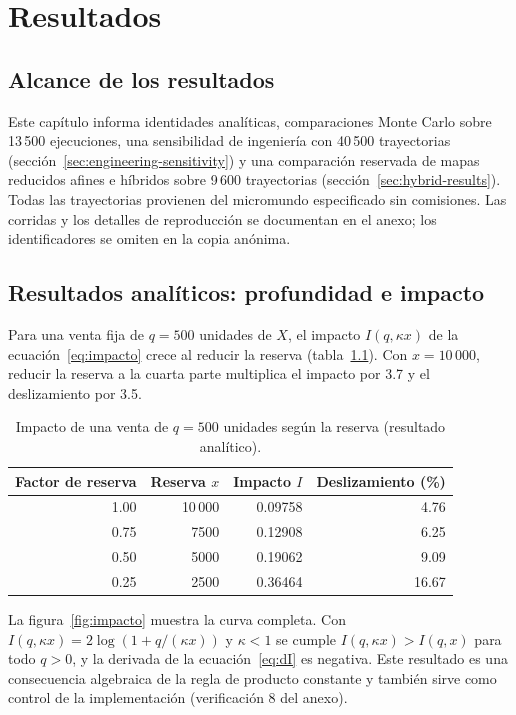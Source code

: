 \chapter{Resultados}
\label{cap:resultados}

\section{Alcance de los resultados}

Este capítulo informa identidades analíticas, comparaciones Monte Carlo sobre 13\,500 ejecuciones, una sensibilidad de ingeniería con 40\,500 trayectorias (sección~\ref{sec:engineering-sensitivity}) y una comparación reservada de mapas reducidos afines e híbridos sobre 9\,600 trayectorias (sección~\ref{sec:hybrid-results}). Todas las trayectorias provienen del micromundo especificado sin comisiones. Las corridas y los detalles de reproducción se documentan en el anexo; los identificadores se omiten en la copia anónima.

\section{Resultados analíticos: profundidad e impacto}
\label{sec:res-analitico}

Para una venta fija de $q=500$ unidades de $X$, el impacto $I(q,\kappa x)$ de la ecuación~\eqref{eq:impacto} crece al reducir la reserva (tabla~\ref{tab:impacto}). Con $x=10\,000$, reducir la reserva a la cuarta parte multiplica el impacto por 3.7 y el deslizamiento por 3.5.

\begin{table}[htbp]
\centering
\caption{Impacto de una venta de $q=500$ unidades según la reserva (resultado analítico).}
\label{tab:impacto}
\small
\begin{tabular}{@{}rrrr@{}}
\toprule
Factor de reserva & Reserva $x$ & Impacto $I$ & Deslizamiento (\%) \\
\midrule
1.00 & 10\,000 & 0.09758 & 4.76 \\
0.75 & 7500 & 0.12908 & 6.25 \\
0.50 & 5000 & 0.19062 & 9.09 \\
0.25 & 2500 & 0.36464 & 16.67 \\
\bottomrule
\end{tabular}
\end{table}

La figura~\ref{fig:impacto} muestra la curva completa. Con $I(q,\kappa x)=2\log(1+q/(\kappa x))$ y $\kappa<1$ se cumple $I(q,\kappa x)>I(q,x)$ para todo $q>0$, y la derivada de la ecuación~\eqref{eq:dI} es negativa. Este resultado es una consecuencia algebraica de la regla de producto constante y también sirve como control de la implementación (verificación 8 del anexo).

